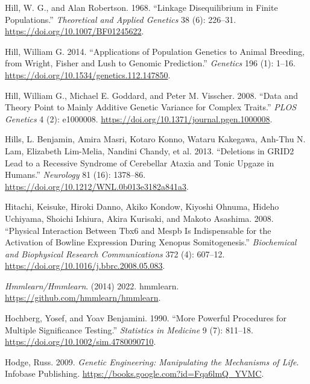 \documentclass[
]{book}
\newlength{\cslhangindent}
\newlength{\cslentryspacingunit} %
\newenvironment{CSLReferences}[2] %
 {%
  \setlength{\parindent}{0pt}
  \ifodd #1
  \let\oldpar\par
  \def\par{\hangindent=\cslhangindent\oldpar}
  \fi
  \setlength{\parskip}{#2\cslentryspacingunit}
 }%
 {}
\begin{document}
\begin{CSLReferences}{1}{0}
\leavevmode{}%
Hill, W. G., and Alan Robertson. 1968. {``Linkage Disequilibrium in Finite Populations.''} \emph{Theoretical and Applied Genetics} 38 (6): 226--31. \url{https://doi.org/10.1007/BF01245622}.

\leavevmode{}%
Hill, William G. 2014. {``Applications of {Population Genetics} to {Animal Breeding}, from {Wright}, {Fisher} and {Lush} to {Genomic Prediction}.''} \emph{Genetics} 196 (1): 1--16. \url{https://doi.org/10.1534/genetics.112.147850}.

\leavevmode{}%
Hill, William G., Michael E. Goddard, and Peter M. Visscher. 2008. {``Data and {Theory Point} to {Mainly Additive Genetic Variance} for {Complex Traits}.''} \emph{PLOS Genetics} 4 (2): e1000008. \url{https://doi.org/10.1371/journal.pgen.1000008}.

\leavevmode{}%
Hills, L. Benjamin, Amira Masri, Kotaro Konno, Wataru Kakegawa, Anh-Thu N. Lam, Elizabeth Lim-Melia, Nandini Chandy, et al. 2013. {``Deletions in {GRID2} Lead to a Recessive Syndrome of Cerebellar Ataxia and Tonic Upgaze in Humans.''} \emph{Neurology} 81 (16): 1378--86. \url{https://doi.org/10.1212/WNL.0b013e3182a841a3}.

\leavevmode{}%
Hitachi, Keisuke, Hiroki Danno, Akiko Kondow, Kiyoshi Ohnuma, Hideho Uchiyama, Shoichi Ishiura, Akira Kurisaki, and Makoto Asashima. 2008. {``Physical Interaction Between {Tbx6} and Mespb Is Indispensable for the Activation of Bowline Expression During {Xenopus} Somitogenesis.''} \emph{Biochemical and Biophysical Research Communications} 372 (4): 607--12. \url{https://doi.org/10.1016/j.bbrc.2008.05.083}.

\leavevmode{}%
\emph{Hmmlearn/Hmmlearn}. (2014) 2022. {hmmlearn}. \url{https://github.com/hmmlearn/hmmlearn}.

\leavevmode{}%
Hochberg, Yosef, and Yoav Benjamini. 1990. {``More Powerful Procedures for Multiple Significance Testing.''} \emph{Statistics in Medicine} 9 (7): 811--18. \url{https://doi.org/10.1002/sim.4780090710}.

\leavevmode{}%
Hodge, Russ. 2009. \emph{Genetic {Engineering}: {Manipulating} the {Mechanisms} of {Life}}. {Infobase Publishing}. \url{https://books.google.com?id=Fqa6lmQ_YVMC}.


\end{CSLReferences}
\end{document}
